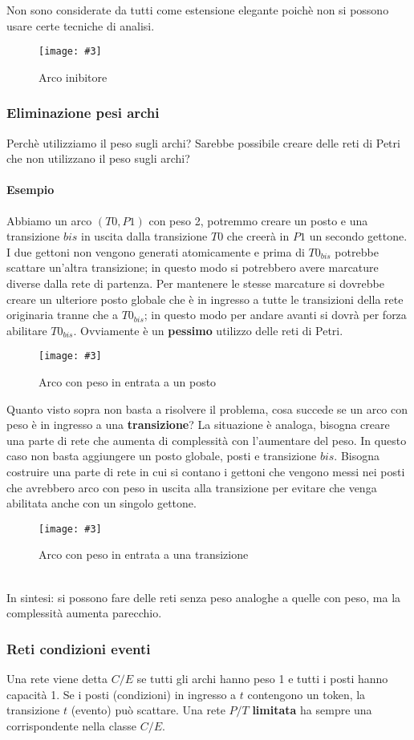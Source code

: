 \documentclass[12pt, twoside, letterpaper]{article}
\newcommand{\img}[3] {
	\begin{figure}[h]
		\caption{#1}
		\centering
		\texttt{[image: \#3]}\\
	\end{figure}
}
\begin{document}
				Non sono considerate da tutti come estensione elegante poichè non si possono usare certe tecniche di analisi.
				\img{Arco inibitore}{0.4}{img/archi_inibitori.png}
				
			\subsubsection{Eliminazione pesi archi}
				Perchè utilizziamo il peso sugli archi? Sarebbe possibile creare delle reti di Petri che non utilizzano il peso sugli archi? 
				
				\paragraph{Esempio} Abbiamo un arco $(T0,P1)$ con peso 2, potremmo creare un posto e una transizione $bis$ in uscita dalla transizione $T0$ che creerà in $P1$ un secondo gettone. I due gettoni non vengono generati atomicamente e prima di $T0_{bis}$ potrebbe scattare un'altra transizione; in questo modo si potrebbero avere marcature diverse dalla rete di partenza. Per mantenere le stesse marcature si dovrebbe creare un ulteriore posto globale che è in ingresso a tutte le transizioni della rete originaria tranne che a $T0_{bis}$; in questo modo per andare avanti si dovrà per forza abilitare $T0_{bis}$. Ovviamente è un \textbf{pessimo} utilizzo delle reti di Petri.
				\img{Arco con peso in entrata a un posto}{0.4}{img/p_globale.png}
				
				Quanto visto sopra non basta a risolvere il problema, cosa succede se un arco con peso è in ingresso a una \textbf{transizione}? La situazione è analoga, bisogna creare una parte di rete che aumenta di complessità con l'aumentare del peso. In questo caso non basta aggiungere un posto globale, posti e transizione $bis$. Bisogna costruire una parte di rete in cui si contano i gettoni che vengono messi nei posti che avrebbero arco con peso in uscita alla transizione per evitare che venga abilitata anche con un singolo gettone.
				\img{Arco con peso in entrata a una transizione}{0.4}{img/p_globale2.png}
				\\In sintesi: si possono fare delle reti senza peso analoghe a quelle con peso, ma la complessità aumenta parecchio. 
				
			\subsubsection{Reti condizioni eventi}
				Una rete viene detta $C/E$ se tutti gli archi hanno peso 1 e tutti i posti hanno capacità 1. Se i posti (condizioni) in ingresso a $t$ contengono un token, la transizione $t$ (evento) può scattare. Una rete $P/T$ \textbf{limitata} ha sempre una corrispondente nella classe $C/E$. 
				
\end{document}
